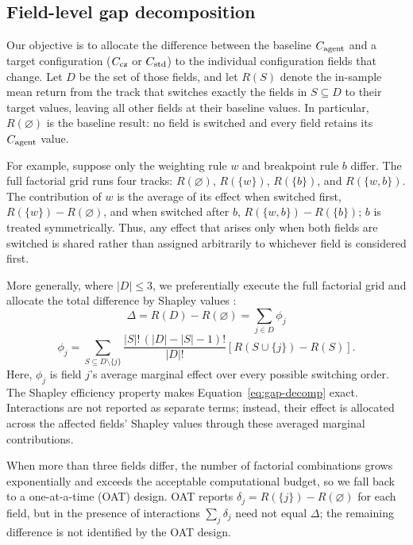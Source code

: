 \subsection{Field-level gap decomposition}
Our objective is to allocate the difference between the baseline
$C_{\text{agent}}$ and a target configuration ($C_{\text{cz}}$ or $C_{\text{std}}$) to the individual
configuration fields that change. Let $D$ be the set of those fields, and
let $R(S)$ denote the in-sample mean return from the track that switches
exactly the fields in $S \subseteq D$ to their target values, leaving all
other fields at their baseline values. In particular, $R(\varnothing)$ is
the baseline result: no field is switched and every field retains its
$C_{\text{agent}}$ value.

For example, suppose only the weighting rule $w$ and breakpoint rule $b$
differ. The full factorial grid runs four tracks: $R(\varnothing)$,
$R(\{w\})$, $R(\{b\})$, and $R(\{w,b\})$. The contribution of $w$ is the
average of its effect when switched first, $R(\{w\})-R(\varnothing)$, and
when switched after $b$, $R(\{w,b\})-R(\{b\})$; $b$ is treated
symmetrically. Thus, any effect that arises only when both fields are
switched is shared rather than assigned arbitrarily to whichever field is
considered first.

More generally, where $|D| \leq 3$, we preferentially execute the full
factorial grid and allocate the total difference by Shapley values
\citep{Shapley1953}:
\begin{equation}
  \label{eq:gap-decomp}
  \Delta = R(D) - R(\varnothing) = \sum_{j \in D} \phi_j
\end{equation}
\begin{equation}
  \label{eq:shapley-effect}
  \phi_j = \sum_{S \subseteq D \setminus \{j\}}
  \frac{|S|!\,(|D|-|S|-1)!}{|D|!}
  \left[R(S \cup \{j\}) - R(S)\right].
\end{equation}
Here, $\phi_j$ is field $j$'s average marginal effect over every possible
switching order. The Shapley efficiency property makes
Equation~\eqref{eq:gap-decomp} exact. Interactions are not reported as
separate terms; instead, their effect is allocated across the affected
fields' Shapley values through these averaged marginal contributions.

When more than three fields differ, the number of factorial combinations
grows exponentially and exceeds the acceptable computational budget, so we
fall back to a one-at-a-time (OAT) design. OAT reports
$\delta_j = R(\{j\}) - R(\varnothing)$ for each field, but in the presence
of interactions $\sum_j \delta_j$ need not equal $\Delta$; the remaining
difference is not identified by the OAT design.

